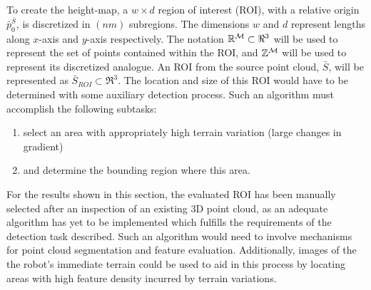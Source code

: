 			To create the height-map, a $w\times d$ region of interest (ROI),  with a relative origin $\bar{p}_{0}^{\bar{S}}$, is discretized in $(nm)$ subregions. The dimensions $w$ and $d$ represent lengths along $x$-axis and $y$-axis respectively. The notation ${\Bbb R}^{{\cal M}}\subset \Re^{3}$ will be used to represent the set of points contained within the ROI, and ${\Bbb Z}^{{\cal M}}$ will be used to represent its discretized analogue. An ROI from the source point cloud, $\bar{S}$, will be represented as $\bar{S}_{ROI}\subset\Re^{3}$. The location and size of this ROI would have to be determined with some auxiliary detection process. Such an algorithm must accomplish the following subtasks:
			\begin{enumerate}
				\item select an area with appropriately high terrain variation (large changes in gradient)
				\item and determine the bounding region where this area.
			\end{enumerate}
			For the results shown in this section, the evaluated ROI has been manually selected after an inspection of an existing 3D point cloud, as an adequate algorithm has yet to be implemented which fulfills the requirements of the detection task described. Such an algorithm would need to involve mechanisms for point cloud segmentation and feature evaluation. Additionally, images of the the robot's immediate terrain could be used to aid in this process by locating areas with high feature density incurred by terrain variations.

